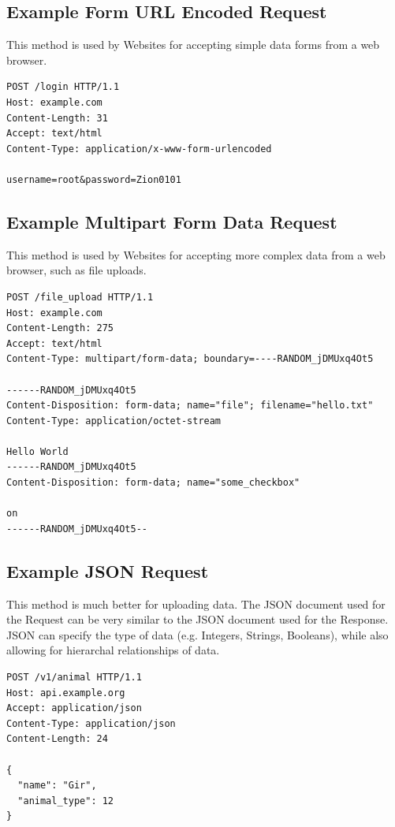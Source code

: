 \documentclass{book}
\begin{document}
\subsection{Example Form URL Encoded Request}

This method is used by Websites for accepting simple data forms from a web browser.

\begin{verbatim}
POST /login HTTP/1.1
Host: example.com
Content-Length: 31
Accept: text/html
Content-Type: application/x-www-form-urlencoded

username=root&password=Zion0101
\end{verbatim}

\subsection{Example Multipart Form Data Request}

This method is used by Websites for accepting more complex data from a web browser, such as file uploads.

\begin{verbatim}
POST /file_upload HTTP/1.1
Host: example.com
Content-Length: 275
Accept: text/html
Content-Type: multipart/form-data; boundary=----RANDOM_jDMUxq4Ot5

------RANDOM_jDMUxq4Ot5
Content-Disposition: form-data; name="file"; filename="hello.txt"
Content-Type: application/octet-stream

Hello World
------RANDOM_jDMUxq4Ot5
Content-Disposition: form-data; name="some_checkbox"

on
------RANDOM_jDMUxq4Ot5--
\end{verbatim}

\subsection{Example JSON Request}

This method is much better for uploading data. The JSON document used for the Request can be very similar to the JSON document used for the Response. JSON can specify the type of data (e.g. Integers, Strings, Booleans), while also allowing for hierarchal relationships of data.

\begin{verbatim}
POST /v1/animal HTTP/1.1
Host: api.example.org
Accept: application/json
Content-Type: application/json
Content-Length: 24

{
  "name": "Gir",
  "animal_type": 12
}
\end{verbatim}
\end{document}
